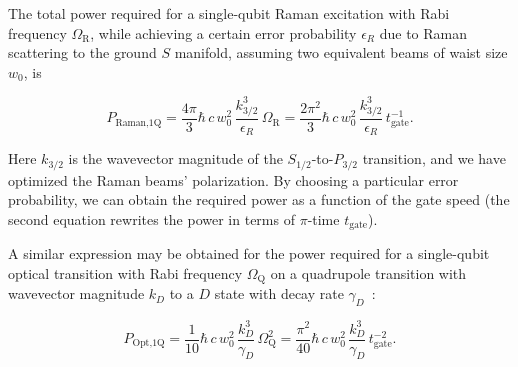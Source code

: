 \documentclass[%
reprint,
 amsmath,amssymb,
]{revtex4-1}
\begin{document}
The total power required for a single-qubit Raman excitation with Rabi frequency $\Omega_{\textrm{R}}$, while achieving a certain error probability $\epsilon_R$ due to Raman scattering to the ground $S$ manifold, assuming two equivalent beams of waist size $w_0$, is~\cite{PhysRevA.75.042329_2007}

\begin{equation}
P_{\textrm{Raman,1Q}}=\frac{4\pi}{3} \hbar\, c\, w_{0}^{2}\, \frac{k_{3/2}^{3}}{\epsilon_R}\, \Omega_{\textrm{R}}=\frac{2\pi^{2}}{3} \hbar\, c\, w_{0}^{2}\, \frac{k_{3/2}^{3}}{\epsilon_R}\, t^{-1}_{\textrm{gate}}.
\label{p_raman}
\end{equation}


\noindent Here $k_{3/2}$ is the wavevector magnitude of the $S_{1/2}$-to-$P_{3/2}$ transition, and we have optimized the Raman beams' polarization.  By choosing a particular error probability, we can obtain the required power as a function of the gate speed (the second equation rewrites the power in terms of $\pi$-time $t_{\textrm{gate}}$).

A similar expression may be obtained for the power required for a single-qubit optical transition with Rabi frequency $\Omega_{\textrm{Q}}$ on a quadrupole transition with wavevector magnitude $k_{D}$ to a $D$ state with decay rate $\gamma_{D}$~\cite{James1998}:

\begin{equation}
P_{\textrm{Opt,1Q}}=\frac{1}{10} \hbar\, c\, w_{0}^{2}\, \frac{k_{D}^{3}}{\gamma_{D}}\, \Omega^{2}_{\textrm{Q}}=\frac{\pi^{2}}{40} \hbar\, c\, w_{0}^{2}\, \frac{k_{D}^{3}}{\gamma_{D}}\, t^{-2}_{\textrm{gate}}.
\label{p_optical}
\end{equation}
\end{document}
